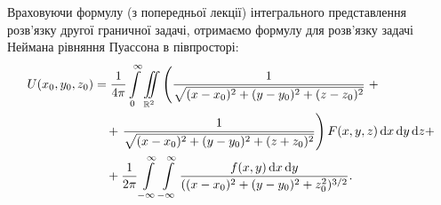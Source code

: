 Враховуючи формулу  (з попередньої лекції) інтегрального представлення розв'язку другої граничної задачі, отримаємо формулу для розв'язку задачі Неймана рівняння Пуассона в півпросторі:
\begin{equation}
	\begin{aligned}
		U(x_0, y_0, z_0) &= \frac{1}{4 \pi} \displaystyle\int\limits_0^\infty \displaystyle\iint\limits_{\mathbb{R}^2} \left( \frac{1}{\sqrt{(x - x_0)^2 + (y - y_0)^2 + (z - z_0)^2}} \right. + \\
		& \quad + \left. \frac{1}{\sqrt{(x - x_0)^2 + (y - y_0)^2 + (z + z_0)^2}} \right) F(x, y, z) \mathop{}\!\mathrm{d} x \mathop{}\!\mathrm{d} y \mathop{}\!\mathrm{d} z + \\
		& \quad + \frac{1}{2 \pi} \displaystyle\int\limits_{-\infty}^\infty \displaystyle\int\limits_{-\infty}^\infty \frac{f(x, y) \mathop{}\!\mathrm{d} x \mathop{}\!\mathrm{d} y}{((x - x_0)^2 + (y - y_0)^2 + z_0^2)^{3/2}}.
	\end{aligned}
\end{equation}


